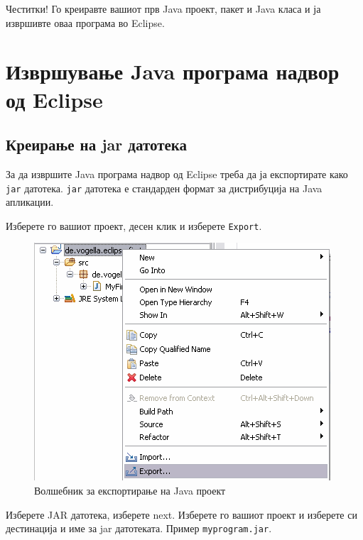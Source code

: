 Честитки! Го креиравте вашиот прв Java проект, пакет и Java класа и ја извршивте
оваа програма во Eclipse.

\section{Извршување Java програма надвор од Eclipse}

\subsection{Креирање на jar датотека}

За да извршите Java програма надвор од Eclipse треба да ја експортирате како
\texttt{jar} датотека. \texttt{jar} датотека е стандарден формат за дистрибуција
на Java апликации.

Изберете го вашиот проект, десен клик и изберете \texttt{Export}.

\begin{figure}
\centering
\includegraphics[scale=.5]{images/export}
\caption{Волшебник за експортирање на Java проект}
\end{figure}

Изберете JAR датотека, изберете next. Изберете го вашиот проект и изберете си
дестинација и име за jar датотеката. Пример \texttt{myprogram.jar}.

